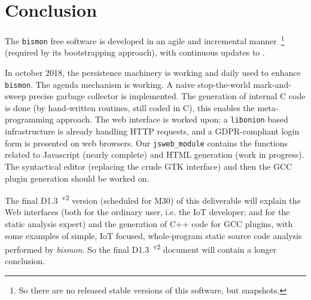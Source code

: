 \section{Conclusion}
\label{sec:conclusion}

The \texttt{bismon} free software is developed in an agile and
incremental manner~\footnote{So there are no released stable versions
  of this software, but snapshots.} (required by its bootstrapping
approach), with continuous updates to
.

In october 2018, the persistence machinery is working and daily used
to enhance \texttt{bismon}. The agenda mechanism is working. A naive
stop-the-world mark-and-sweep precise garbage collector is
implemented. The generation of internal C code is done (by
hand-written routines, still coded in C), this enables the
meta-programming approach. The web interface is worked upon: a
\texttt{libonion} based infrastructure is already handling HTTP
requests, and a GDPR-compliant login form is presented on web
browsers. Our \texttt{jsweb\_module} contains the functions related to
Javascript (nearly complete) and HTML generation (work in progress). The
syntactical editor (replacing the crude GTK interface) and then the
GCC plugin generation should be worked on.

The final D1.3~\textsuperscript{v2} version (scheduled for M30) of
this deliverable will explain the Web interfaces (both for the
ordinary user, i.e. the IoT developer; and for the static analysis
expert) and the generation of C++ code for GCC plugins, with some
examples of simple, IoT focused, whole-program static source code
analysis performed by \emph{bismon}. So the final
D1.3~\textsuperscript{v2} document will contain a longer conclusion.


\medskip

